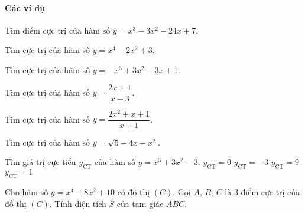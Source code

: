 \paragraph{Các ví dụ}
\begin{vd}%
	Tìm điểm cực trị của hàm số $y=x^3-3x^2-24x+7$.
\end{vd}
\begin{vd}%
	Tìm cực trị của hàm số $y=x^4-2x^2+3$.
\end{vd}
\begin{vd}%
	Tìm cực trị của hàm số $y=-x^3+3x^2-3x+1$.
\end{vd}
\begin{vd}%
	Tìm cực trị của hàm số $y=\dfrac{2x+1}{x-3}$.
\end{vd}
\begin{vd}%
	Tìm cực trị của hàm số $y=\dfrac{2x^2+x+1}{x+1}$.
\end{vd}
\begin{vd}%
	Tìm cực trị của hàm số $y=\sqrt{5-4x-x^2}$.
\end{vd}
\begin{vd}%
	Tìm giá trị cực tiểu $y_{\text{CT}}$ của hàm số $y=x^3+3x^2-3$. 
	\choice
	{$y_{\text{CT}}=0$}
	{\True $y_{\text{CT}}=-3$}
	{$y_{\text{CT}}=9$}
	{$y_{\text{CT}}=1$}
\end{vd}
\begin{vd}%
	Cho hàm số $y=x^4-8x^2+10$ có đồ thị $(C)$. Gọi $A$, $B$, $C$ là $3$ điểm cực trị của đồ thị $(C)$. Tính diện tích $S$ của tam giác $ABC$. 
\end{vd}
